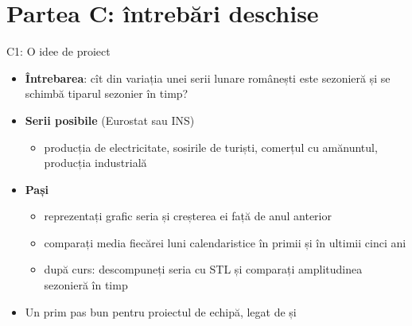 \section{Partea C: întrebări deschise}

\begin{frame}{C1: O idee de proiect}
\itemsize{\small}
\begin{itemize}
    \item \textbf{Întrebarea}: cît din variația unei serii lunare românești este sezonieră și se schimbă tiparul sezonier în timp?
    \item \textbf{Serii posibile} (Eurostat sau INS)
    \begin{itemize}
        \item producția de electricitate, sosirile de turiști, comerțul cu amănuntul, producția industrială
    \end{itemize}
    \item \textbf{Pași}
    \begin{itemize}
        \item reprezentați grafic seria și creșterea ei față de anul anterior
        \item comparați media fiecărei luni calendaristice în primii și în ultimii cinci ani
        \item după curs: descompuneți seria cu STL și comparați amplitudinea sezonieră în timp
    \end{itemize}
    \item Un prim pas bun pentru proiectul de echipă, legat de  și 
\end{itemize}
\end{frame}


